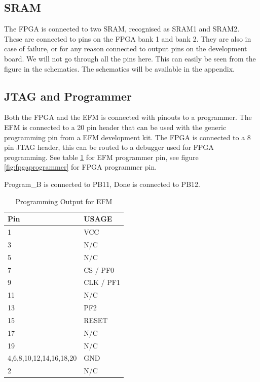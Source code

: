 \subsection{SRAM}
The FPGA is connected to two SRAM, recognised as SRAM1 and SRAM2. These are connected to pins on the FPGA bank 1 and bank 2.  They are also in case of failure, or for any reason connected to output pins on the development board. We will not go through all the pins here. This can easily be seen from the figure in the schematics. The schematics will be available in the appendix. 

\subsection{JTAG and Programmer}
Both the FPGA and the EFM is connected with pinouts to a programmer. The EFM is connected to a 20 pin header that can be used with the generic programming pin from a EFM development kit. 
The FPGA is connected to a 8 pin JTAG header, this can be routed to a debugger used for FPGA programming.  See table \ref{tab:efmprogrammer} for EFM programmer pin, see figure \ref{fig:fpgaprogrammer} for FPGA programmer pin.

Program\_B is connected to PB11, Done is connected to PB12.
\begin{table}[]
    \centering
    \caption{Programming Output for EFM}
    \begin{tabular}{ll}
        Pin                     & USAGE     \\
        \hline
        1                       & VCC       \\
        3                       & N/C       \\
        5                       & N/C       \\
        7                       & CS / PF0  \\
        9                       & CLK / PF1 \\
        11                      & N/C       \\
        13                      & PF2       \\
        15                      & RESET     \\
        17                      & N/C       \\
        19                      & N/C       \\
        4,6,8,10,12,14,16,18,20 & GND       \\
        2                       & N/C
    \end{tabular}
    \label{tab:efmprogrammer}
\end{table}

